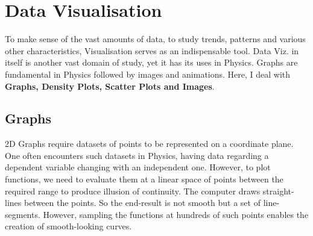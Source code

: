 \section{Data Visualisation}
To make sense of the vast amounts of data, to study trends, patterns and various other characteristics, Visualisation serves as an indispensable tool. Data Viz. in itself is another vast domain of study, yet it has its uses in Physics. Graphs are fundamental in Physics followed by images and animations. Here, I deal with \textbf{Graphs, Density Plots, Scatter Plots and Images}.
\subsection{Graphs}
2D Graphs require datasets of points to be represented on a coordinate plane. One often encounters such datasets in Physics, having data regarding a dependent variable changing with an independent one. However, to plot functions, we need to evaluate them at a linear space of points between the required range to produce illusion of continuity. The computer draws straight-lines between the points. So the end-result is not smooth but a set of line-segments. However, sampling the functions at hundreds of such points enables the creation of smooth-looking curves.\medskip \\
